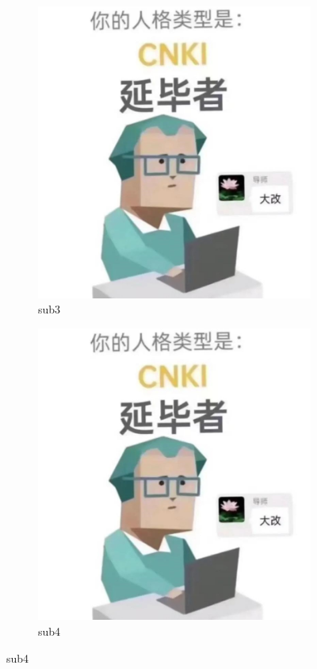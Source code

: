 \begin{figure}[!ht]\ContinuedFloat \centering
	\begin{subfigure}[b]{0.49\textwidth}\centering
		\includegraphics[width=\textwidth]{./Graphs/example/example.jpeg}
		\caption{sub3}\label{subf::sub3}
	\end{subfigure}\hfill %
	\begin{subfigure}[b]{0.49\textwidth}\centering
		\includegraphics[width=\textwidth]{./Graphs/example/example.jpeg}
		\caption{sub4}\label{subf::sub4}
	\end{subfigure}
\end{figure}
